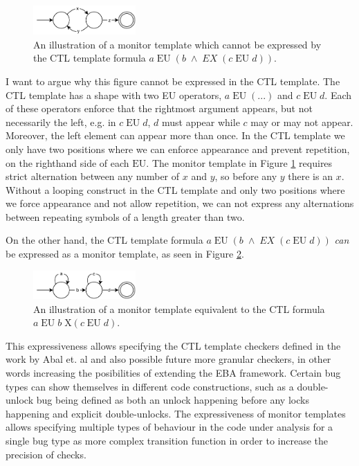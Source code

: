 \begin{figure}[H]
    \centering
    \includegraphics[width=0.35\textwidth]{evaluation/figures/long-monitor}
    \caption{An illustration of a monitor template which cannot be expressed by the CTL template formula $a\;\text{EU}\;(b\;\land\;EX\;(c\;\text{EU}\;d))$.}
    \label{long-monitor}
\end{figure}

\newpar I want to argue why this figure cannot be expressed in the CTL template. The CTL template has a shape with two EU operators, $a\;\text{EU}\;(...)$ and $c\;\text{EU}\;d$. Each of these operators enforce that the rightmost argument appears, but not necessarily the left, e.g. in $c\;\text{EU}\;d$, $d$ must appear while $c$ may or may not appear. Moreover, the left element can appear more than once. In the CTL template we only have two positions where we can enforce appearance and prevent repetition, on the righthand side of each $\text{EU}$. The monitor template in Figure \ref{long-monitor} requires strict alternation between any number of $x$ and $y$, so before any $y$ there is an $x$. Without a looping construct in the CTL template and only two positions where we force appearance and not allow repetition, we can not express any alternations between repeating symbols of a length greater than two. 

\newpar On the other hand, the CTL template formula $a\;\text{EU}\;(b\;\land\;EX\;(c\;\text{EU}\;d))$ \textit{can} be expressed as a monitor template, as seen in Figure \ref{ctl-as-monitor}. 

\begin{figure}[H]
    \centering
    \includegraphics[width=0.35\textwidth]{evaluation/figures/ctl-as-monitor}
    \caption{An illustration of a monitor template equivalent to the CTL formula $a\;\text{EU}\;b\;\text{X}(c\;\text{EU}\;d)$.}
    \label{ctl-as-monitor}
\end{figure}

\newpar This expressiveness allows specifying the CTL template checkers defined in the work by Abal et. al and also possible future more granular checkers, in other words increasing the posibilities of extending the EBA framework. Certain bug types can show themselves in different code constructions, such as a double-unlock bug being defined as both an unlock happening before any locks happening and explicit double-unlocks. The expressiveness of monitor templates allows specifying multiple types of behaviour in the code under analysis for a single bug type as more complex transition function in order to increase the precision of checks.

